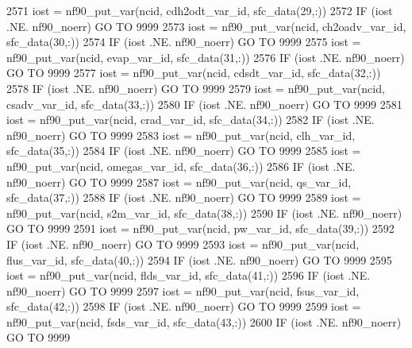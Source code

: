 \begin{DoxyCode}
{{{{{{2571     iost    = nf90\_put\_var(ncid,    cdh2odt\_var\_id,     sfc\_data(29,:))
2572     \textcolor{keywordflow}{IF} (iost .NE. nf90\_noerr) \textcolor{keywordflow}{GO TO} 9999
2573     iost    = nf90\_put\_var(ncid,    ch2oadv\_var\_id,     sfc\_data(30,:))
2574     \textcolor{keywordflow}{IF} (iost .NE. nf90\_noerr) \textcolor{keywordflow}{GO TO} 9999
2575     iost    = nf90\_put\_var(ncid,    evap\_var\_id,        sfc\_data(31,:))
2576     \textcolor{keywordflow}{IF} (iost .NE. nf90\_noerr) \textcolor{keywordflow}{GO TO} 9999
2577     iost    = nf90\_put\_var(ncid,    cdsdt\_var\_id,       sfc\_data(32,:))
2578     \textcolor{keywordflow}{IF} (iost .NE. nf90\_noerr) \textcolor{keywordflow}{GO TO} 9999
2579     iost    = nf90\_put\_var(ncid,    csadv\_var\_id,       sfc\_data(33,:))
2580     \textcolor{keywordflow}{IF} (iost .NE. nf90\_noerr) \textcolor{keywordflow}{GO TO} 9999
2581     iost    = nf90\_put\_var(ncid,    crad\_var\_id,        sfc\_data(34,:))
2582     \textcolor{keywordflow}{IF} (iost .NE. nf90\_noerr) \textcolor{keywordflow}{GO TO} 9999
2583     iost    = nf90\_put\_var(ncid,    clh\_var\_id,         sfc\_data(35,:))
2584     \textcolor{keywordflow}{IF} (iost .NE. nf90\_noerr) \textcolor{keywordflow}{GO TO} 9999
2585     iost    = nf90\_put\_var(ncid,    omegas\_var\_id,      sfc\_data(36,:))
2586     \textcolor{keywordflow}{IF} (iost .NE. nf90\_noerr) \textcolor{keywordflow}{GO TO} 9999
2587     iost    = nf90\_put\_var(ncid,    qs\_var\_id,          sfc\_data(37,:))
2588     \textcolor{keywordflow}{IF} (iost .NE. nf90\_noerr) \textcolor{keywordflow}{GO TO} 9999
2589     iost    = nf90\_put\_var(ncid,    s2m\_var\_id,         sfc\_data(38,:))
2590     \textcolor{keywordflow}{IF} (iost .NE. nf90\_noerr) \textcolor{keywordflow}{GO TO} 9999
2591     iost    = nf90\_put\_var(ncid,    pw\_var\_id,          sfc\_data(39,:))
2592     \textcolor{keywordflow}{IF} (iost .NE. nf90\_noerr) \textcolor{keywordflow}{GO TO} 9999
2593     iost    = nf90\_put\_var(ncid,    flus\_var\_id,        sfc\_data(40,:))
2594     \textcolor{keywordflow}{IF} (iost .NE. nf90\_noerr) \textcolor{keywordflow}{GO TO} 9999
2595     iost    = nf90\_put\_var(ncid,    flds\_var\_id,        sfc\_data(41,:))
2596     \textcolor{keywordflow}{IF} (iost .NE. nf90\_noerr) \textcolor{keywordflow}{GO TO} 9999
2597     iost    = nf90\_put\_var(ncid,    fsus\_var\_id,        sfc\_data(42,:))
2598     \textcolor{keywordflow}{IF} (iost .NE. nf90\_noerr) \textcolor{keywordflow}{GO TO} 9999
2599     iost    = nf90\_put\_var(ncid,    fsds\_var\_id,        sfc\_data(43,:))
2600     \textcolor{keywordflow}{IF} (iost .NE. nf90\_noerr) \textcolor{keywordflow}{GO TO} 9999
}}}}}}
\end{DoxyCode}
